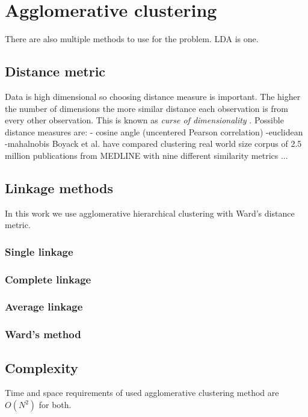 \section{Agglomerative clustering}
\label{sec:agglomerativeclustering}
There are also multiple methods to use for the problem. LDA is one.

\subsection{Distance metric}
Data is high dimensional so choosing distance measure is 
important. The higher the number of dimensions the more similar 
distance each observation is from every other observation. This is
known as \emph{curse of dimensionality} .
Possible distance measures are:
- cosine angle (uncentered Pearson correlation)
-euclidean
-mahalnobis
Boyack et al. have compared clustering 
real world size corpus of 2.5 million publications from MEDLINE
with nine different similarity metrics \cite{boyack_clustering_2011}...

\subsection{Linkage methods}
In this work we use agglomerative hierarchical clustering with 
Ward's distance metric.

\subsubsection{Single linkage}
\subsubsection{Complete linkage}
\subsubsection{Average linkage}
\subsubsection{Ward's method}

\subsection{Complexity}
Time and space requirements of used agglomerative clustering method
are $O(N^2)$ for both.


